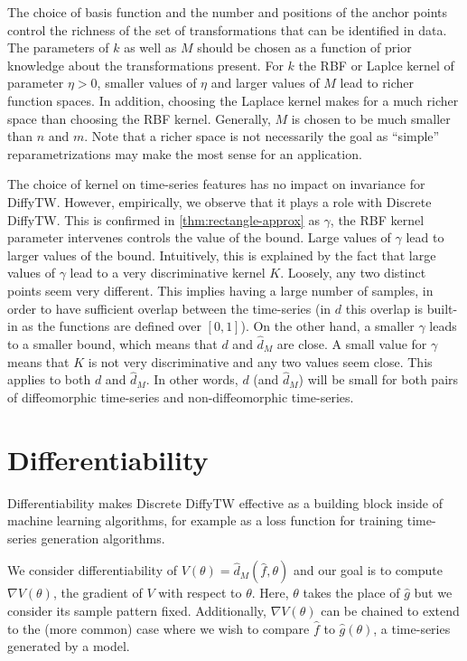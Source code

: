 The choice of basis function and the number and positions of the anchor points control the richness of the set of transformations that can be identified in data. The parameters of $k$ as well as $M$ should be chosen as a function of prior knowledge about the transformations present. For $k$ the RBF or Laplce kernel of parameter $\eta>0$, smaller values of $\eta$ and larger values of $M$ lead to richer function spaces. In addition, choosing the Laplace kernel makes for a much richer space than choosing the RBF kernel. Generally, $M$ is chosen to be much smaller than $n$ and $m$. Note that a richer space is not necessarily the goal as ``simple'' reparametrizations may make the most sense for an application.

The choice of kernel on time-series features has no impact on invariance for DiffyTW. However, empirically, we observe that it plays a role with Discrete DiffyTW. This is confirmed in \cref{thm:rectangle-approx} as $\gamma$, the RBF kernel parameter intervenes controls the value of the bound. Large values of $\gamma$ lead to larger values of the bound. Intuitively, this is explained by the fact that large values of $\gamma$ lead to a very discriminative kernel $K$. Loosely, any two distinct points seem very different. This implies having a large number of samples, in order to have sufficient overlap between the time-series (in $d$ this overlap is built-in as the functions are defined over $[0,1]$). On the other hand, a smaller $\gamma$ leads to a smaller bound, which means that $d$ and $\hat d_M$ are close. A small value for $\gamma$ means that $K$ is not very discriminative and any two values seem close. This applies to both $d$ and $\hat d_M$. In other words, $d$ (and $\hat d_M$) will be small for both pairs of diffeomorphic time-series and non-diffeomorphic time-series.

\section{Differentiability}
Differentiability makes Discrete DiffyTW effective as a building block inside of machine learning algorithms, for example as a loss function for training time-series generation algorithms.

We consider differentiability of $V(\theta) = \hat d_M(\hat f, \theta)$ and our goal is to compute $\nabla V(\theta)$, the gradient of $V$ with respect to $\theta$. Here, $\theta$ takes the place of $\hat g$ but we consider its sample pattern fixed. Additionally, $\nabla V(\theta)$ can be chained to extend to the (more common) case where we wish to compare $\hat f$ to $\hat g(\theta)$, a time-series generated by a model.

